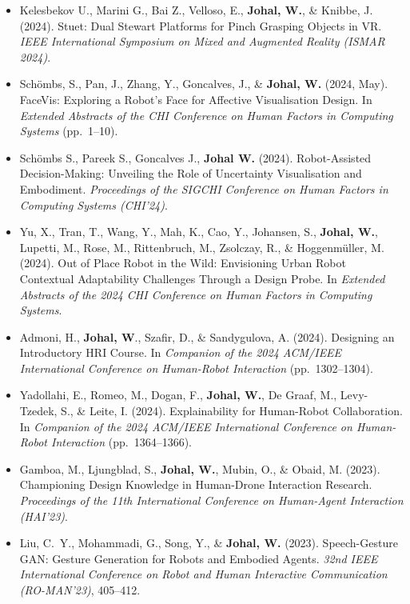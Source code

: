 \begin{itemize}[nosep]
    \item Kelesbekov U., Marini G., Bai Z., Velloso, E., \textbf{Johal, W.}, \& Knibbe, J. (2024). Stuet: Dual Stewart Platforms for Pinch Grasping Objects in VR. \textit{IEEE International Symposium on Mixed and Augmented Reality (ISMAR 2024)}.

    \item Schömbs, S., Pan, J., Zhang, Y., Goncalves, J., \& \textbf{Johal, W.} (2024, May). FaceVis: Exploring a Robot's Face for Affective Visualisation Design. In \textit{Extended Abstracts of the CHI Conference on Human Factors in Computing Systems} (pp.\ 1--10).

    \item Schömbs S., Pareek S., Goncalves J., \textbf{Johal W.} (2024). Robot-Assisted Decision-Making: Unveiling the Role of Uncertainty Visualisation and Embodiment. \textit{Proceedings of the SIGCHI Conference on Human Factors in Computing Systems (CHI'24)}.

    \item Yu, X., Tran, T., Wang, Y., Mah, K., Cao, Y., Johansen, S., \textbf{Johal, W.}, Lupetti, M., Rose, M., Rittenbruch, M., Zsolczay, R., \& Hoggenmüller, M. (2024). Out of Place Robot in the Wild: Envisioning Urban Robot Contextual Adaptability Challenges Through a Design Probe. In \textit{Extended Abstracts of the 2024 CHI Conference on Human Factors in Computing Systems}.

    \item Admoni, H., \textbf{Johal, W}., Szafir, D., \& Sandygulova, A. (2024). Designing an Introductory HRI Course. In \textit{Companion of the 2024 ACM/IEEE International Conference on Human-Robot Interaction} (pp.\ 1302--1304).

    \item Yadollahi, E., Romeo, M., Dogan, F., \textbf{Johal, W.}, De Graaf, M., Levy-Tzedek, S., \& Leite, I. (2024). Explainability for Human-Robot Collaboration. In \textit{Companion of the 2024 ACM/IEEE International Conference on Human-Robot Interaction} (pp.\ 1364--1366).

    \item Gamboa, M., Ljungblad, S., \textbf{Johal, W.}, Mubin, O., \& Obaid, M. (2023). Championing Design Knowledge in Human-Drone Interaction Research. \textit{Proceedings of the 11th International Conference on Human-Agent Interaction (HAI'23)}.

    \item Liu, C.\ Y., Mohammadi, G., Song, Y., \& \textbf{Johal, W.} (2023). Speech-Gesture GAN: Gesture Generation for Robots and Embodied Agents. \textit{32nd IEEE International Conference on Robot and Human Interactive Communication (RO-MAN'23)}, 405--412.


\end{itemize}
